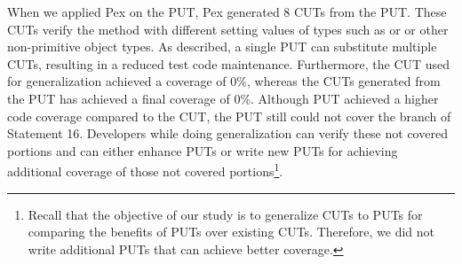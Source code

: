 When we applied Pex on the PUT, Pex generated $8$ CUTs from the PUT. These CUTs verify the  method with different setting values of types such as  or  or other non-primitive object types. As described, a single PUT can substitute multiple CUTs, resulting in a reduced test code maintenance. Furthermore, the CUT used for generalization achieved a coverage of $0$\%, whereas the CUTs generated from the PUT has achieved a final coverage of $0$\%. Although PUT achieved a higher code coverage compared to the CUT, the PUT still could not cover the  branch of Statement 16. Developers while doing generalization can verify these not covered portions and can either enhance PUTs or write new PUTs for achieving additional coverage of those not covered portions\footnote{Recall that the objective of our study is to generalize CUTs to PUTs for comparing the benefits of PUTs over existing CUTs. Therefore, we did not write additional PUTs that can achieve better coverage.}. 

